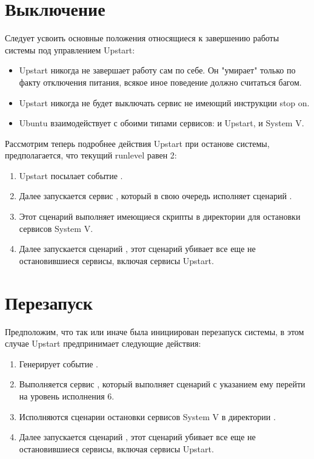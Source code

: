 \section{Выключение}
Следует усвоить основные положения относящиеся к завершению работы системы под управлением Upstart: \begin{itemize}
\item Upstart никогда не завершает работу сам по себе. Он "умирает" только по факту отключения питания, 
всякое иное поведение должно считаться багом.
\item Upstart никогда не будет выключать сервис не имеющий инструкции stop on.
\item Ubuntu взаимодействует с обоими типами сервисов: и Upstart, и System V.
\end{itemize}

Рассмотрим теперь подробнее действия Upstart при останове системы, предполагается, что текущий runlevel равен 2: \begin{enumerate}
\item Upstart посылает событие .
\item Далее запускается сервис , который в свою очередь исполняет сценарий .
\item Этот сценарий выполняет имеющиеся скрипты в директории  для остановки сервисов System V.
\item Далее запускается сценарий , этот сценарий убивает все еще не остановившиеся сервисы, включая сервисы Upstart.
\end{enumerate}
\section{Перезапуск}
Предположим, что так или иначе была инициирован перезапуск системы, в этом случае Upstart предпринимает следующие действия: \begin{enumerate}
\item Генерирует событие .
\item Выполняется сервис , который выполняет сценарий  с указанием ему перейти на уровень исполнения 6. 
\item Исполняются сценарии остановки сервисов System V в директории .
\item Далее запускается сценарий , этот сценарий убивает все еще не остановившиеся сервисы, включая сервисы Upstart.
\end{enumerate}
